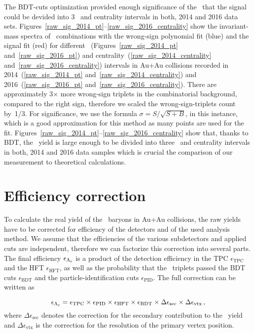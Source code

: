 The BDT-cuts optimization provided enough significance of the \Lambdac\ that the signal could be devided into 3 \pt\ and centrality intervals in both, 2014 and 2016 data sets. Figures~\ref{raw_sig_2014_pt}--\ref{raw_sig_2016_centrality} show the invariant-mass spectra of \pKpi\ combinations with the wrong-sign polynomial fit (blue) and the signal fit (red) for different \pt~(Figures~\ref{raw_sig_2014_pt} and~\ref{raw_sig_2016_pt}) and centrality~(\ref{raw_sig_2014_centrality} and~\ref{raw_sig_2016_centrality}) intervals in Au+Au collisions recorded in 2014~(\ref{raw_sig_2014_pt} and~\ref{raw_sig_2014_centrality}) and 2016~(\ref{raw_sig_2016_pt} and~\ref{raw_sig_2016_centrality})\@. There are approximately 3$\times$ more wrong-sign triplets in the combinatorial background, compared to the right sign, therefore we scaled the wrong-sign-triplets count by~1/3\@. For significance, we use the formula $\sigma = S / \sqrt{S + B}$, in this instance, which is a good approximation for this method as many points are used for the fit. Figures~\ref{raw_sig_2014_pt}--\ref{raw_sig_2016_centrality} show that, thanks to BDT, the \Lambdacpm\ yield is large enough to be divided into three \pt\ and centrality intervals in both, 2014 and 2016 data samples which is crucial the comparison of our measurement to theoretical calculations.


\section{Efficiency correction}

To calculate the real yield of the \Lambdac\ baryons in Au+Au collisions, the raw yields have to be corrected for efficiency of the detectors and of the used analysis method. We assume that the efficiencies of the various subdetectors and applied cuts are independent, therefore we can factorize this correction into several parts. The final efficiency $\epsilon_{{\Lambda_\text{c}}}$ is a product of the detection efficiency in the TPC $\epsilon_\mathrm{TPC}$ and the HFT $\epsilon_\mathrm{HFT}$, as well as the probability that the \Lambdac\ triplets passed the BDT cuts $\epsilon_\mathrm{BDT}$ and the particle-identification cuts $\epsilon_\mathrm{PID}$\@. The full correction can be written as

\begin{equation}
 \epsilon_{{\Lambda_\text{c}}} = \epsilon_\text{TPC} \times \epsilon_\text{PID} \times \epsilon_\text{HFT} \times \epsilon_\text{BDT} \times \Delta\epsilon_\text{sec} \times \Delta\epsilon_\text{vtx}\,,
\end{equation}
where $\Delta \epsilon_\mathrm{sec}$ denotes the correction for the secondary contribution to the \Lambdac\ yield and $\Delta\epsilon_\mathrm{vtx}$ is the correction for the resolution of the primary vertex position.

